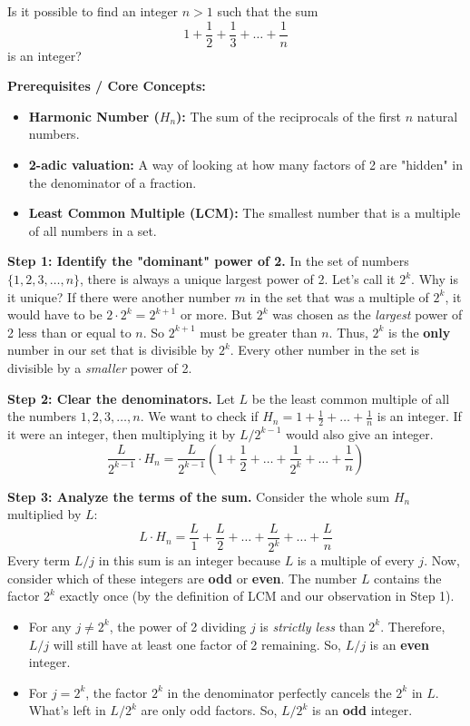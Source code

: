 \begin{exercise}
\label{algebra:2011:10}
Is it possible to find an integer $n > 1$ such that the sum
\[ 1 + \frac{1}{2} + \frac{1}{3} + \dots + \frac{1}{n} \]
is an integer?
\end{exercise}

\begin{solution}
\textbf{Prerequisites / Core Concepts:}
\begin{itemize}
    \item \textbf{Harmonic Number ($H_n$):} The sum of the reciprocals of the first $n$ natural numbers.
    \item \textbf{2-adic valuation:} A way of looking at how many factors of 2 are "hidden" in the denominator of a fraction.
    \item \textbf{Least Common Multiple (LCM):} The smallest number that is a multiple of all numbers in a set.
\end{itemize}

\textbf{Step 1: Identify the "dominant" power of 2.}
In the set of numbers $\{1, 2, 3, \dots, n\}$, there is always a unique largest power of 2. Let's call it $2^k$. 
Why is it unique? If there were another number $m$ in the set that was a multiple of $2^k$, it would have to be $2 \cdot 2^k = 2^{k+1}$ or more. But $2^k$ was chosen as the \textit{largest} power of 2 less than or equal to $n$. So $2^{k+1}$ must be greater than $n$.
Thus, $2^k$ is the \textbf{only} number in our set that is divisible by $2^k$. Every other number in the set is divisible by a \textit{smaller} power of 2.

\textbf{Step 2: Clear the denominators.}
Let $L$ be the least common multiple of all the numbers $1, 2, 3, \dots, n$.
We want to check if $H_n = 1 + \frac{1}{2} + \dots + \frac{1}{n}$ is an integer. 
If it were an integer, then multiplying it by $L/2^{k-1}$ would also give an integer.
\[ \frac{L}{2^{k-1}} \cdot H_n = \frac{L}{2^{k-1}} \left( 1 + \frac{1}{2} + \dots + \frac{1}{2^k} + \dots + \frac{1}{n} \right) \]

\textbf{Step 3: Analyze the terms of the sum.}
Consider the whole sum $H_n$ multiplied by $L$:
\[ L \cdot H_n = \frac{L}{1} + \frac{L}{2} + \dots + \frac{L}{2^k} + \dots + \frac{L}{n} \]
Every term $L/j$ in this sum is an integer because $L$ is a multiple of every $j$.
Now, consider which of these integers are \textbf{odd} or \textbf{even}.
The number $L$ contains the factor $2^k$ exactly once (by the definition of LCM and our observation in Step 1). 
\begin{itemize}
    \item For any $j \neq 2^k$, the power of 2 dividing $j$ is \textit{strictly less} than $2^k$. Therefore, $L/j$ will still have at least one factor of 2 remaining. So, $L/j$ is an \textbf{even} integer.
    \item For $j = 2^k$, the factor $2^k$ in the denominator perfectly cancels the $2^k$ in $L$. What's left in $L/2^k$ are only odd factors. So, $L/2^k$ is an \textbf{odd} integer.
\end{itemize}


\end{solution}
